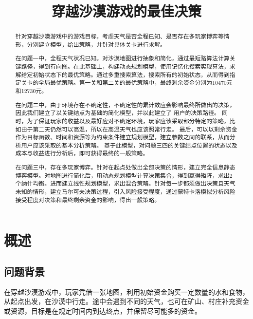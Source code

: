 \documentclass[bwprint]{cumcmthesis} %
\title{穿越沙漠游戏的最佳决策}
\begin{document}
 \maketitle
 \begin{abstract}
    
针对穿越沙漠游戏中的游戏目标，考虑天气是否全程已知、是否存在多玩家博弈等情形，分别建立模型，给出策略，并针对具体关卡进行求解。

在问题一中，全程天气状况已知。对沙漠地图进行抽象和简化，通过最短路算法计算关键路径，得到有向图。在此基础上，构建动态规划模型，使用记忆化搜索实现算法，求解给定初始状态下的最优策略。通过多重搜索算法，搜索所有的初始状态，从而得到指定关卡的全局最优策略。第一关和第二关的最优策略中，最终剩余资金分别为10470元和12730元。

在问题二中，由于环境存在不确定性，不确定性的累计效应会影响最终所做出的决策，因此我们建立了以关键结点为基础的简化模型，并以此建立了
用户的决策路径。
同时，为了保证玩家的收益以及最好应对不确定环境，玩家应该采取部分特定的策略，比如由于第二天仍然可以高温，所以在高温天气也应该照常行走。
最后，可以以剩余资金作为目标函数、时间和资源等为约束条件建立规划模型，建立参数之间的联系，从而分析用户应该采取的基本分析策略。
基于此模型，对问题三四的关键结点位置的状态以及成本与收益进行分析后，即可获得最终的一般策略。

在问题三中，存在多玩家博弈。针对在起点处做出全部决策的情形，建立完全信息静态博弈模型。对地图进行简化后，用动态规划模型计算决策集合，得到赢得矩阵，求出2个纳什均衡。进而建立线性规划模型，求出混合策略。针对每一步都须做出决策且天气未知的情形，建立马尔可夫决策过程，引入风险接受程度，通过蒙特卡洛模拟分析风险接受程度对决策和最终剩余资金的影响，得出一般策略。


\end{abstract}


\section{概述}
\subsection{问题背景}
\label{subsec:simulate}

在穿越沙漠游戏中，玩家凭借一张地图，利用初始资金购买一定数量的水和食物，从起点出发，在沙漠中行走。途中会遇到不同的天气，也可在矿山、村庄补充资金或资源，目标是在规定时间内到达终点，并保留尽可能多的资金。
\end{document}
